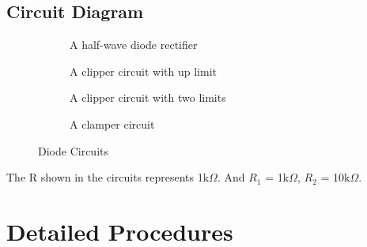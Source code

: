     \subsection{Circuit Diagram}
    \begin{figure}[h]

        \begin{subfigure}[h]{0.47\textwidth}
        \begin{center}
            
            \caption{A half-wave diode rectifier}
            \label{Lab2a}
        \end{center} 
        \end{subfigure}
    \hfill
    \vspace{0.2 cm}
        \begin{subfigure}[h]{0.47\textwidth}
        \begin{center}
            
            \caption{A clipper circuit with up limit}
            \label{Lab2b}
        \end{center}
        \end{subfigure}
    \vfill
    \vspace{0.2 cm}
        \begin{subfigure}[h]{0.47\textwidth}
        \begin{center}
             
            \caption{A clipper circuit with two limits}
            \label{Lab2c}
        \end{center}
        \end{subfigure}
    \hfill
        \begin{subfigure}[h]{0.47\textwidth}
        \begin{center}
            
            \caption{A clamper circuit}
            \label{Lab2d}
        \end{center}
        \end{subfigure}
    \caption{Diode Circuits}
    \label{SDC}

    \end{figure}
\FloatBarrier
The R shown in the circuits represents 1k$\Omega$. And $R_1$ = 1k$\Omega$, $R_2$ = 10k$\Omega$.



\section{Detailed Procedures}
